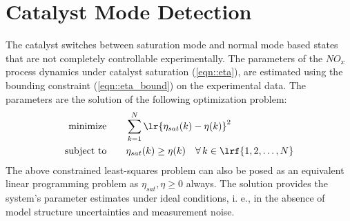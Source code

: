 \section{Catalyst Mode Detection}
The catalyst switches between saturation mode and normal mode based states that are not completely controllable experimentally.
The parameters of the $NO_x$ process dynamics under catalyst saturation (\ref{eqn::eta}), are estimated using the bounding constraint (\ref{eqn::eta_bound}) on the experimental data. The parameters are the solution of the following optimization problem:
\begin{align}
\text{minimize} &\qquad \sum_{k=1}^{N} \lr{ \eta_{sat}(k) - \eta(k)} ^2 \\
\text{subject to} &\qquad \eta_{sat}(k) \geq \eta(k) \quad \forall \, k \in \lrf{1,2,\hdots, N} \notag
\end{align}
The above constrained least-squares problem can also be posed as an equivalent linear programming problem as $\eta_{sat}, \eta \geq 0$ always. The solution provides the system's parameter estimates under ideal conditions, i.
e., in the absence of model structure uncertainties and measurement noise.
